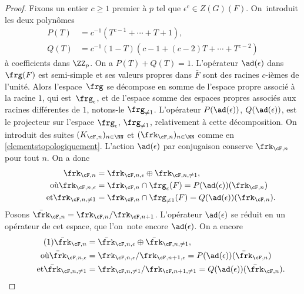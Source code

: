 \begin{proof}
Fixons un entier $c\geq1$ premier à $p$ tel que $\epsilon^c\in Z(G)(F)$. On~intro\-duit les deux polynômes
\begin{align*}
P(T)&=c^{-1}(T^{c-1}+\cdots+T+1),\\
Q(T)&=c^{-1}(1-T)(c-1+(c-2)T+\cdots+T^{c-2})
\end{align*}
à coefficients dans $\ZZ_{p}$. On a $P(T)+Q(T)=1$.
L'opérateur $\ad(\epsilon)$ dans $\frg(F)$ est semi-simple et ses valeurs propres dans $\bar{F}$ sont des racines $c$-ièmes de l'unité. Alors l'espace~$\frg$ se décompose en somme de l'espace propre associé à la racine $1$, qui est~$\frg_{\epsilon}$, et de l'espace somme des espaces propres associés aux racines différentes de $1$, notons-le $\frg_{\neq1}$. L'opérateur $P(\ad(\epsilon))$, \resp $Q(\ad(\epsilon))$, est le projecteur sur l'espace $\frg_{\epsilon}$, \resp $\frg_{\neq1}$, relativement à cette décomposition.
On introduit des suites $(K_{\cF,n})_{n\in \NN}$ et $(\frk_{\cF,n})_{n\in \NN}$ comme en \ref{elementstopologiquement}. L'action $\ad(\epsilon)$ par conjugaison conserve $\frk_{\cF,n}$ pour tout $n$. On a donc
\begin{align*}
\frk_{\cF,n}&=\frk_{\cF,n,\epsilon}\oplus \frk_{\cF,n,\neq1},
\\
\tag*{où}
\frk_{\cF,n,\epsilon}&=\frk_{\cF,n}\cap \frg_{\epsilon}(F)=P(\ad(\epsilon))(\frk_{\cF,n})\\
\tag*{et}
\frk_{\cF,n,\neq1}&=\frk_{\cF,n}\cap \frg_{\neq1}(F)=Q(\ad(\epsilon))(\frk_{\cF,n}).
\end{align*}
Posons $\bar{\frk}_{\cF,n}=\frk_{\cF,n}/\frk_{\cF,n+1}$. L'opérateur $\ad(\epsilon)$ se réduit en un opérateur de cet espace, que l'on~note encore $\ad(\epsilon)$. On a encore
\begin{align*}
\tag{1}\label{commutant1}
\bar{\frk}_{\cF,n}&=\bar{\frk}_{\cF,n,\epsilon}\oplus \bar{\frk}_{\cF,n,\neq1},
\\
\tag*{où}
\bar{\frk}_{\cF,n,\epsilon}&=\frk_{\cF,n,\epsilon}/\frk_{\cF,n+1,\epsilon}=P(\ad(\epsilon))(\bar{\frk}_{\cF,n})\\
\tag*{et}
\bar{\frk}_{\cF,n,\neq1}&=\frk_{\cF,n,\neq1}/\frk_{\cF,n+1,\neq1}=Q(\ad(\epsilon))(\bar{\frk}_{\cF,n}).
\end{align*}


\end{proof}
